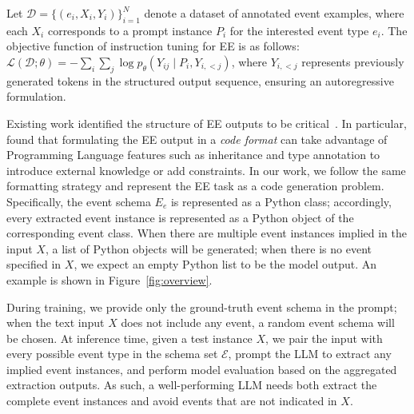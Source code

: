 Let \( \mathcal{D} = \{(e_i, X_i, Y_i)\}_{i=1}^{N} \) denote a dataset of annotated event examples, where each \( X_i \) corresponds to a prompt instance \( P_i \) for the interested event type $e_i$. The objective function of instruction tuning for EE is as follows: $\mathcal{L}(\mathcal{D}; \theta) = - \sum_{i} \sum_{j} \log p_{\theta} (Y_{ij} \mid P_i, Y_{i,<j})$,
where \( Y_{i,<j} \) represents previously generated tokens in the structured output sequence, ensuring an autoregressive formulation. 

Existing work identified the structure of EE outputs to be critical~\cite{jiao-etal-2023-instruct, wang2023code4struct}. In particular, \citet{wang2023code4struct} found that formulating the EE output in a \emph{code format} can {take advantage of Programming Language features such as inheritance and type annotation to introduce external knowledge or add constraints.} In our work, we follow the same formatting strategy and represent the EE task as a code generation problem. Specifically, the event schema ${E}_e$ is represented as a Python class; accordingly, every extracted event instance is represented as a Python object of the corresponding event class. When there are multiple event instances implied in the input $X$, a list of Python objects will be generated; when there is no event specified in $X$, we expect an empty Python list to be the model output. An example is shown in Figure~\ref{fig:overview}.

During training, we provide only the ground-truth event schema in the prompt; when the text input $X$ does not include any event, a random event schema will be chosen. 
At inference time, given a test instance $X$, we pair the input with every possible event type in the schema set $\mathcal{E}$, prompt the LLM to extract any implied event instances, and perform model evaluation based on the aggregated extraction outputs. As such, a well-performing LLM needs both extract the complete event instances and avoid events that are not indicated in $X$.



